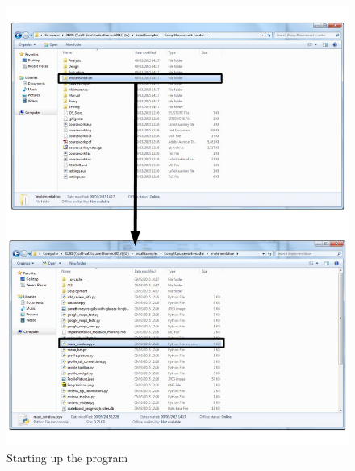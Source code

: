\begin{figure}[H]
    \includegraphics[width=\textwidth]{./Manual/Images/RunningProgram.pdf}
    \caption{Starting up the program} \label{fig:Running Program}
\end{figure}

